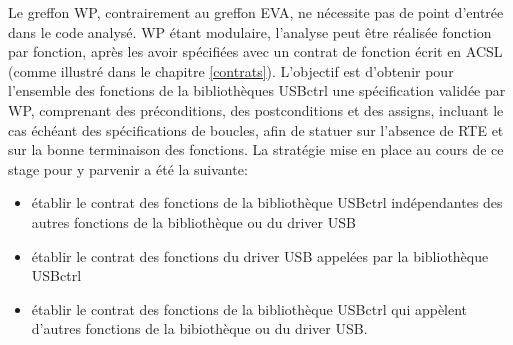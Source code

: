 Le greffon WP, contrairement au greffon EVA, ne nécessite pas de point d'entrée dans le code analysé. WP étant modulaire, l'analyse peut être réalisée fonction par fonction, après les avoir spécifiées avec un contrat de fonction écrit en ACSL (comme illustré dans le chapitre \ref{contrats}). L'objectif est d'obtenir pour l'ensemble des fonctions de la bibliothèques USBctrl une spécification validée par WP, comprenant des préconditions, des postconditions et des assigns, incluant le cas échéant des spécifications de boucles, afin de statuer sur l'absence de RTE et sur la bonne terminaison des fonctions.
\newline \noindent
La stratégie mise en place au cours de ce stage pour y parvenir a été la suivante:
\begin{itemize}
	\item établir le contrat des fonctions de la bibliothèque USBctrl indépendantes des autres fonctions de la bibliothèque ou du driver USB
	\item établir le contrat des fonctions du driver USB appelées par la bibliothèque USBctrl
	\item établir le contrat des fonctions de la bibliothèque USBctrl qui appèlent d'autres fonctions de la bibiothèque ou du driver USB.
\end{itemize}

